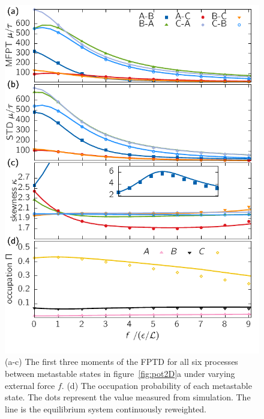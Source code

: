 \begin{figure}
\centering
 \includegraphics{../plots/Urew/mom_5010.pdf}
 \caption[The first three moments and the population of metastable states for the 2D system for varying external force.]{ (a-c) The first three moments of the FPTD for all six processes between metastable states in figure~\ref{fig:pot2D}a under varying external force $f$. (d) The occupation probability of each metastable state. The dots represent the value measured from simulation. The line is the equilibrium system continuously reweighted. }
 \label{fig:mom2D}
\end{figure}

